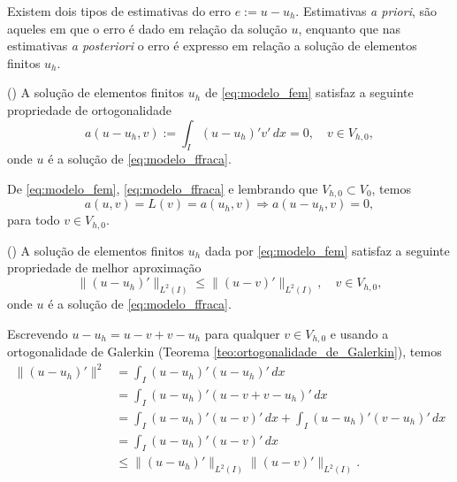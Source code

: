 Existem dois tipos de estimativas do erro $e := u - u_h$. Estimativas {\it a priori}, são aqueles em que o erro é dado em relação da solução $u$, enquanto que nas estimativas {\it a posteriori} o erro é expresso em relação a solução de elementos finitos $u_h$.

\begin{teo}()\label{teo:ortogonalidade_de_Galerkin}
  A solução de elementos finitos $u_h$ de \eqref{eq:modelo_fem} satisfaz a seguinte propriedade de ortogonalidade
  \begin{equation}
    a(u-u_h,v) := \int_I (u-u_h)'v'\,dx = 0,\quad v\in V_{h,0},
  \end{equation}
onde $u$ é a solução de \eqref{eq:modelo_ffraca}.
\end{teo}
\begin{dem}
  De \eqref{eq:modelo_fem}, \eqref{eq:modelo_ffraca} e lembrando que $V_{h,0}\subset V_0$, temos
  \begin{equation}
    a(u,v) = L(v) = a(u_h,v) \Rightarrow a(u-u_h, v) = 0,
  \end{equation}
para todo $v\in V_{h,0}$.
\end{dem}

\begin{teo}()\label{teo:fem1d_melhor_aprox}
  A solução de elementos finitos $u_h$ dada por \eqref{eq:modelo_fem} satisfaz a seguinte propriedade de melhor aproximação
  \begin{equation}
    \|(u-u_h)'\|_{L^2(I)} \leq \|(u-v)'\|_{L^2(I)},\quad v\in V_{h,0},\label{eq:modelo_melhor_aprox}
  \end{equation}
onde $u$ é a solução de \eqref{eq:modelo_ffraca}.
\end{teo}
\begin{dem}
  Escrevendo $u-u_h = u-v+v-u_h$ para qualquer $v\in V_{h,0}$ e usando a ortogonalidade de Galerkin (Teorema \ref{teo:ortogonalidade_de_Galerkin}), temos
  \begin{align}
    \|(u-u_h)'\|^2 &= \int_{I} (u-u_h)'(u-u_h)'\,dx\\
    &= \int_I (u-u_h)'(u-v+v-u_h)'\,dx\\
    &= \int_I (u-u_h)'(u-v)'\,dx + \int_I (u-u_h)'(v-u_h)'\,dx\\
    &= \int_I (u-u_h)'(u-v)'\,dx\\
    &\leq \|(u-u_h)'\|_{L^2(I)}\|(u-v)'\|_{L^2(I)}.
  \end{align}
\end{dem}

